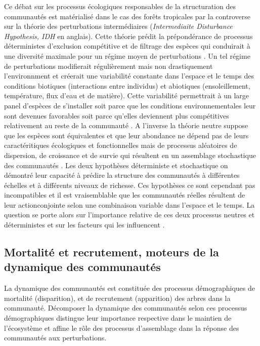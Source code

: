 \documentclass[
  11pt,
  french,
  A4paper,
  extrafontsizes,onecolumn,openright
  ]{memoir}
\begin{document}
Ce débat sur les processus écologiques responsables de la structuration
des communautés est matérialisé dans le cas des forêts tropicales par la
controverse sur la théorie des perturbations intermédiaires
(\emph{Intermediaite Disturbance Hypothesis, IDH} en anglais). Cette
théorie prédit la prépondérance de processus déterministes d'exclusion
compétitive et de filtrage des espèces qui conduirait à une diversité
maximale pour un régime moyen de perturbations \autocite{Molino2001}. Un
tel régime de perturbations modifierait régulièrement mais non
drastiquement l'environnment et créerait une variabilité constante dans
l'espace et le temps des conditions biotiques (interactions entre
individus) et abiotiques (ensoleillement, température, flux d'eau et de
matière). Cette variabilité permettrait à un large panel d'espèces de
s'installer soit parce que les conditions environnementales leur sont
devenues favorables soit parce qu'elles deviennent plus compétitives
relativement au reste de la communauté
\autocites{Chesson2000alire}{Kariuki2006a}{Berry2008a}. A l'inverse la
théorie neutre suppose que les espèces sont équivalentes et que leur
abondance ne dépend pas de leurs caractéritiques écologiques et
fonctionnelles mais de processus aléatoires de dispersion, de croissance
et de survie qui résultent en un assemblage stochastique des communautés
\autocite{Hubbell2001}. Les deux hypothèses déterministe et stochastique
on démontré leur capacité à prédire la structure des communautés à
différentes échelles et à différents niveaux de richesse. Ces hypothèses
ce sont cependant pas incompatibles et il est vraisemblable que les
communautés réelles résultent de leur actionconjointe selon une
combinaison variable dans l'espace et le temps. La question se porte
alors sur l'importance relative de ces deux processus neutres et
déterministes et sur les facteurs qui les influencent
\autocite{Chave2004}.

\subsection{Mortalité et recrutement, moteurs de la dynamique des
communautés}\label{mortalite-et-recrutement-moteurs-de-la-dynamique-des-communautes}

La dynamique des communautés est constituée des processus démographiques
de mortalité (disparition), et de recrutement (apparition) des arbres
dans la communauté. Décomposer la dynamique des communautés selon ces
processus démographiques distingue leur importance respective dans le
maintien de l'écosystème et affine le rôle des processus d'assemblage
dans la réponse des communautés aux perturbations.
\end{document}
